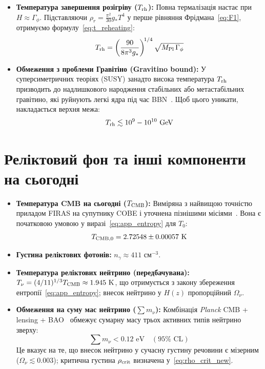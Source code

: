 \begin{itemize}
    \item \textbf{Температура завершення розігріву ($T_{\rm rh}$):}
    Повна термалізація настає при $H \approx \Gamma_\phi$. Підставляючи $\rho_r = \frac{\pi^2}{30}g_* T^4$ у перше рівняння Фрідмана~\eqref{eq:F1}, отримуємо формулу~\eqref{eq:t_reheating}:
    \[ T_{\rm rh} = \left(\frac{90}{8\pi^3 g_*}\right)^{\!1/4} \sqrt{M_{\rm Pl}\,\Gamma_\phi} \]

    \item \textbf{Обмеження з проблеми Гравітіно (Gravitino bound):}
    У суперсиметричних теоріях (SUSY) занадто висока температура $T_{\rm rh}$ призводить до надлишкового народження стабільних або метастабільних гравітино, які руйнують легкі ядра під час BBN~\cite{kofman_1997}. Щоб цього уникати, накладається верхня межа:
    \[ T_{\rm rh} \lesssim 10^9 - 10^{10} \text{ GeV} \]
\end{itemize}

\section{Реліктовий фон та інші компоненти на сьогодні}

\begin{itemize}
    \item \textbf{Температура CMB на сьогодні ($T_{\rm CMB}$):} Виміряна з найвищою точністю приладом FIRAS на супутнику COBE і уточнена пізнішими місіями~\cite{planck_2018}. Вона є початковою умовою у виразі~\eqref{eq:app_entropy} для $T_0$:
    \[ T_{\rm CMB, 0} = 2.72548 \pm 0.00057 \text{ K} \]
    \item \textbf{Густина реліктових фотонів:} $n_\gamma \approx 411 \text{ см}^{-3}$.
    \item \textbf{Температура реліктових нейтрино (передбачувана):} \\
    $T_\nu = (4/11)^{1/3} T_{\rm CMB} \approx 1.945 \text{ K}$, що отримується з закону збереження ентропії~\eqref{eq:app_entropy}; внесок нейтрино у $H(z)$ пропорційний $\Omega_\nu$.
    \item \textbf{Обмеження на суму мас нейтрино ($\sum m_\nu$):} Комбінація \textit{Planck} CMB + lensing + BAO~\cite{planck_2018,eisenstein_2005} обмежує сумарну масу трьох активних типів нейтрино зверху:
    \[ \sum m_\nu < 0.12 \text{ eV} \quad (95\% \text{ CL}) \]
    Це вказує на те, що внесок нейтрино у сучасну густину речовини є мізерним ($\Omega_\nu \lesssim 0.003$); критична густина $\rho_{\rm crit}$ визначена у~\eqref{eq:rho_crit_new}.
\end{itemize}